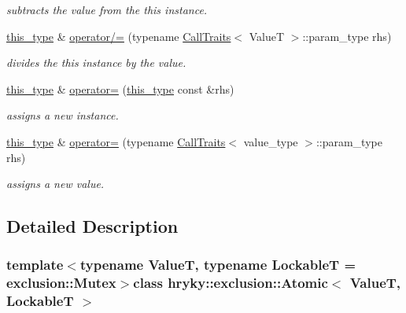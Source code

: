 \begin{DoxyCompactItemize}
\begin{DoxyCompactList}\small\item\em subtracts the value from the this instance. \end{DoxyCompactList}\item 
\hypertarget{classhryky_1_1exclusion_1_1_atomic_a0b07a1b5d5e61787454cddd78c74598a}{\hyperlink{classhryky_1_1exclusion_1_1_atomic_writing_afc6301af19df5cf042e0cbed6d273b2a}{this\-\_\-type} \& \hyperlink{classhryky_1_1exclusion_1_1_atomic_a0b07a1b5d5e61787454cddd78c74598a}{operator/=} (typename \hyperlink{classhryky_1_1_call_traits}{Call\-Traits}$<$ Value\-T $>$\-::param\-\_\-type rhs)}\label{classhryky_1_1exclusion_1_1_atomic_a0b07a1b5d5e61787454cddd78c74598a}

\begin{DoxyCompactList}\small\item\em divides the this instance by the value. \end{DoxyCompactList}\item 
\hyperlink{classhryky_1_1exclusion_1_1_atomic_writing_afc6301af19df5cf042e0cbed6d273b2a}{this\-\_\-type} \& \hyperlink{classhryky_1_1exclusion_1_1_atomic_a166a7f8b91df69f877ad2a530eea5a0a}{operator=} (\hyperlink{classhryky_1_1exclusion_1_1_atomic_writing_afc6301af19df5cf042e0cbed6d273b2a}{this\-\_\-type} const \&rhs)
\begin{DoxyCompactList}\small\item\em assigns a new instance. \end{DoxyCompactList}\item 
\hyperlink{classhryky_1_1exclusion_1_1_atomic_writing_afc6301af19df5cf042e0cbed6d273b2a}{this\-\_\-type} \& \hyperlink{classhryky_1_1exclusion_1_1_atomic_a29b0c850cd2fb169455a898acd6a4a03}{operator=} (typename \hyperlink{classhryky_1_1_call_traits}{Call\-Traits}$<$ value\-\_\-type $>$\-::param\-\_\-type rhs)
\begin{DoxyCompactList}\small\item\em assigns a new value. \end{DoxyCompactList}\end{DoxyCompactItemize}


\subsection{Detailed Description}
\subsubsection*{template$<$typename Value\-T, typename Lockable\-T = exclusion\-::\-Mutex$>$class hryky\-::exclusion\-::\-Atomic$<$ Value\-T, Lockable\-T $>$}

